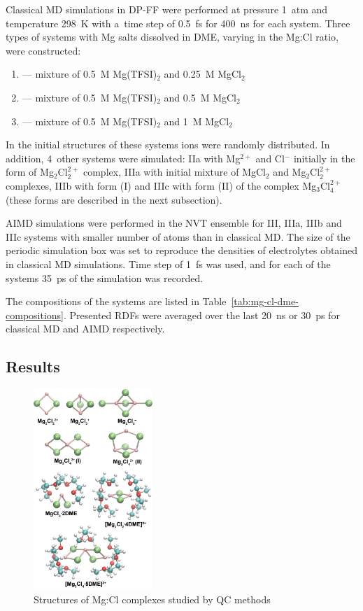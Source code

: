 Classical MD simulations in DP-FF were performed at pressure 1~atm and temperature 298~K with a~time step of 0.5~fs for 400~ns for each system. Three types of systems with Mg salts dissolved in DME, varying in the Mg:Cl ratio, were constructed:
\begin{enumerate}[label=\MakeUppercase{\roman*}]
    \item --- mixture of 0.5~M Mg(TFSI)$_2$ and 0.25~M MgCl$_2$
    \item --- mixture of 0.5~M Mg(TFSI)$_2$ and 0.5~M MgCl$_2$
    \item --- mixture of 0.5~M Mg(TFSI)$_2$ and 1~M MgCl$_2$
\end{enumerate}
In the initial structures of these systems ions were randomly distributed. In addition, 4~other systems were simulated: IIa with Mg$^{2+}$ and Cl$^{-}$ initially in the form of Mg$_2$Cl$_2^{2+}$ complex, IIIa with initial mixture of MgCl$_2$ and Mg$_2$Cl$_2^{2+}$ complexes, IIIb with form (I) and IIIc with form (II) of the complex Mg$_3$Cl$_4^{2+}$ (these forms are described in the next subsection).

AIMD simulations were performed in the NVT ensemble for III, IIIa, IIIb and IIIc systems with smaller number of atoms than in classical MD. The size of the periodic simulation box was set to reproduce the densities of electrolytes obtained in classical MD simulations. Time step of 1~fs was used, and for each of the systems 35~ps of the simulation was recorded.

The compositions of the systems are listed in Table~\ref{tab:mg-cl-dme-compositions}. Presented RDFs were averaged over the last 20~ns or 30~ps for classical MD and AIMD respectively.

\subsection{Results}

\begin{figure}[H]
    \centering
    \includegraphics[width=0.4\textwidth]{img/3-structural-data-from-md-simulations/3-mg-cl-dme/complex-structures.png}
    \caption{Structures of Mg:Cl complexes studied by QC methods}
    \label{fig:mg-cl-dme-structures}
\end{figure}


